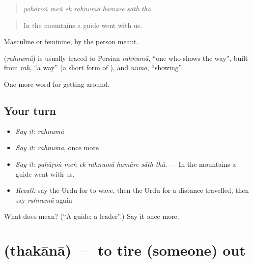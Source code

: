 \begin{quote}
      
\end{quote}

\begin{quote}
\emph{pahāṛoṅ meṅ ek rahnumā hamāre sāth thā.}
\end{quote}

\begin{quote}
In the mountains a guide went with us.
\end{quote}

Masculine or feminine, by the person meant.

\begin{cousinweb}
\textbf{} (\emph{rahnumā}) is usually traced to Persian \emph{rahnumā}, \textquotedblleft{}one who shows the way\textquotedblright{}, built from \emph{rah}, \textquotedblleft{}a way\textquotedblright{} (a short form of \textbf{}), and \emph{numā}, \textquotedblleft{}showing\textquotedblright{}.
\end{cousinweb}

\begin{grammarlens}[title={What you've built}]
One more word for getting around.
\end{grammarlens}

\subsection*{Your turn}
\begin{itemize}
\raggedright
  \item \emph{Say it:} \emph{rahnumā}
  \item \emph{Say it:} \emph{rahnumā}, once more
  \item \emph{Say it:} \emph{pahāṛoṅ meṅ ek rahnumā hamāre sāth thā.} — In the mountains a guide went with us.
  \item \emph{Recall:} say the Urdu for to wave, then the Urdu for a distance travelled, then say \emph{rahnumā} again
\end{itemize}

\begin{tcolorbox}[breakable,colback=teal!4,colframe=teal!35!black,title={Before you move on}]
What does  mean? (\textquotedblleft{}A guide; a leader\textquotedblright{}.) Say it once more.
\end{tcolorbox}
\section[\texorpdfstring{\ur{تھکانا} (thakānā)}{تھکانا (thakānā)}]{ (thakānā) — to tire (someone) out}

